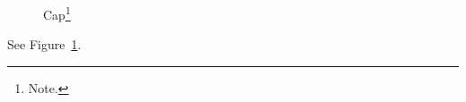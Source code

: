 \documentclass{article}
\begin{document}
\begin{figure}\caption{Cap\protect\footnote{Note.}}\label{f}\end{figure}
See Figure~\ref{f}.
\end{document}
